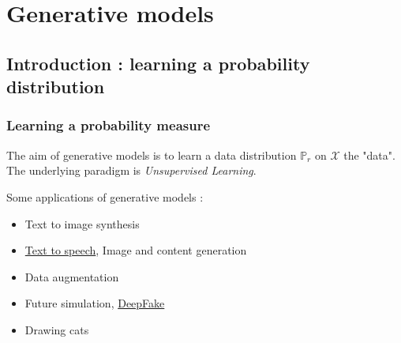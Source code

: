 \documentclass[french,9pt]{beamer}
\begin{document}

\section{Generative models}

\subsection{Introduction : learning a probability distribution}

\begin{frame}
\frametitle{Learning a probability measure}

The aim of generative models is to learn a data distribution $\mathbb{P}_{r}$ on $\mathcal{X}$ the "data". The underlying paradigm is \emph{Unsupervised Learning}.

Some applications of generative models :
\begin{itemize}

\item Text to image synthesis \cite{DBLP:journals/corr/ReedAYLSL16}
\item \href{https://deepmind.com/blog/wavenet-generative-model-raw-audio/}{Text to speech}, Image and content generation \cite{2015arXiv150204623G}
\item Data augmentation \cite{2017arXiv171104340A}
\item Future simulation, \href{https://www.youtube.com/watch?v=PCBTZh41Ris}{DeepFake} \cite{2018arXiv180807371C}
\item Drawing cats

\end{itemize}


\end{frame}
\end{document}
